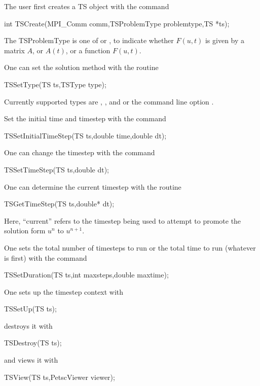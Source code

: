 The user first creates a TS object with the command
\begin{tabbing}
  int TSCreate(MPI\_Comm comm,TSProblemType problemtype,TS *ts);
\end{tabbing}
 The TSProblemType 
is one of  or ,
to indicate whether $ F(u,t) $ is given by a matrix $ A $, or $ A(t) $, or a
function $ F(u,t). $

One can set the solution method with the routine
\begin{tabbing}
 TSSetType(TS ts,TSType type);
\end{tabbing}
 Currently supported types are ,
, and 
  
or the command line option
.  


Set the initial time and timestep with the command
\begin{tabbing}
 TSSetInitialTimeStep(TS ts,double time,double dt);
\end{tabbing}
One  can change the timestep with the command
\begin{tabbing}
 TSSetTimeStep(TS ts,double dt);
\end{tabbing}
One  
can  determine the current timestep with the routine
\begin{tabbing}
 TSGetTimeStep(TS ts,double* dt);
\end{tabbing}
Here, ``current'' refers to the timestep being used to attempt to
promote the solution form $ u^n $ to $ u^{n+1}. $

One sets the total number of timesteps to run or the total time to run 
(whatever is first) with the command 
\begin{tabbing}
 TSSetDuration(TS ts,int maxsteps,double maxtime);
\end{tabbing}
One sets up the timestep context with 
\begin{tabbing}
 TSSetUp(TS ts);
\end{tabbing}
destroys it with 
\begin{tabbing}
 TSDestroy(TS ts);
\end{tabbing}
and views it with 
\begin{tabbing}
 TSView(TS ts,PetscViewer viewer);
\end{tabbing}

